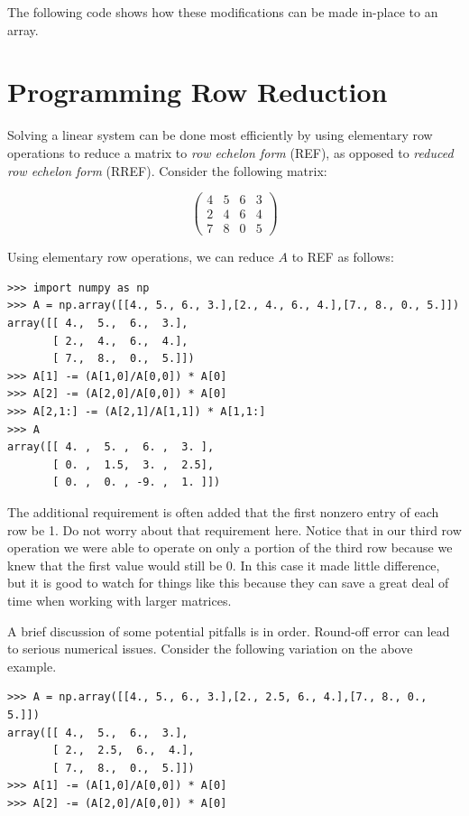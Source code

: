 The following code shows how these modifications can be made in-place to an array.



\section*{Programming Row Reduction}
Solving a linear system can be done most efficiently by using elementary row operations to reduce a matrix to \emph{row echelon form} (REF), as opposed to \emph{reduced row echelon form} (RREF).
Consider the following matrix:

\[
\begin{pmatrix}
4&5&6&3 \\
2&4&6&4 \\
7&8&0&5
\end{pmatrix}
\]

Using elementary row operations, we can reduce $A$ to REF as follows:

\begin{lstlisting}
>>> import numpy as np
>>> A = np.array([[4., 5., 6., 3.],[2., 4., 6., 4.],[7., 8., 0., 5.]])
array([[ 4.,  5.,  6.,  3.],
       [ 2.,  4.,  6.,  4.],
       [ 7.,  8.,  0.,  5.]])
>>> A[1] -= (A[1,0]/A[0,0]) * A[0]
>>> A[2] -= (A[2,0]/A[0,0]) * A[0]
>>> A[2,1:] -= (A[2,1]/A[1,1]) * A[1,1:]
>>> A
array([[ 4. ,  5. ,  6. ,  3. ],
       [ 0. ,  1.5,  3. ,  2.5],
       [ 0. ,  0. , -9. ,  1. ]])
\end{lstlisting}

The additional requirement is often added that the first nonzero entry of each row be 1. Do not worry about that requirement here.
Notice that in our third row operation we were able to operate on only a portion of the third row because we knew that the first value would still be 0. In this case it made little difference, but it is good to watch for things like this because they can save a great deal of time when working with larger matrices.

A brief discussion of some potential pitfalls is in order.
Round-off error can lead to serious numerical issues. Consider the
following variation on the above example.

\begin{lstlisting}
>>> A = np.array([[4., 5., 6., 3.],[2., 2.5, 6., 4.],[7., 8., 0., 5.]])
array([[ 4.,  5.,  6.,  3.],
       [ 2.,  2.5,  6.,  4.],
       [ 7.,  8.,  0.,  5.]])
>>> A[1] -= (A[1,0]/A[0,0]) * A[0]
>>> A[2] -= (A[2,0]/A[0,0]) * A[0]
\end{lstlisting}

